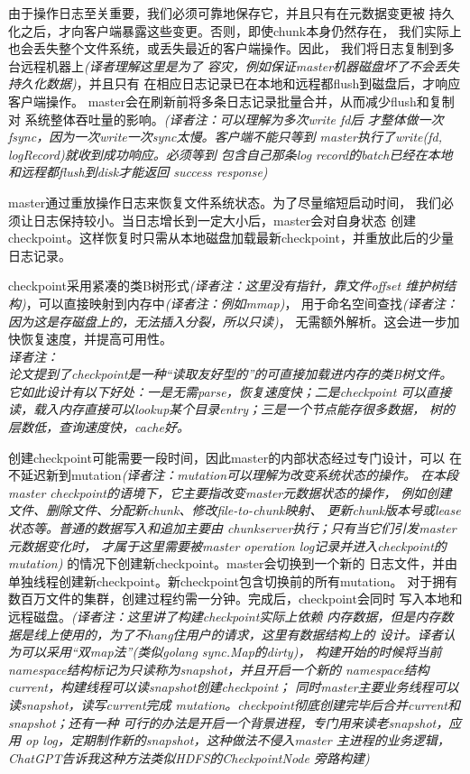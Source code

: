 由于操作日志至关重要，我们必须可靠地保存它，并且只有在元数据变更被
持久化之后，才向客户端暴露这些变更。否则，即使chunk本身仍然存在，
我们实际上也会丢失整个文件系统，或丢失最近的客户端操作。因此，
我们将日志复制到多台远程机器上\emph{(译者理解这里是为了
容灾，例如保证master机器磁盘坏了不会丢失持久化数据)}，并且只有
在相应日志记录已在本地和远程都flush到磁盘后，才响应客户端操作。
master会在刷新前将多条日志记录批量合并，从而减少flush和复制对
系统整体吞吐量的影响。\emph{(译者注：可以理解为多次write fd后
才整体做一次fsync，因为一次write一次sync太慢。客户端不能只等到
master执行了write(fd, logRecord)就收到成功响应。必须等到
包含自己那条log record的batch已经在本地和远程都flush到disk才能返回
success response)}

master通过重放操作日志来恢复文件系统状态。为了尽量缩短启动时间，
我们必须让日志保持较小。当日志增长到一定大小后，master会对自身状态
创建checkpoint。这样恢复时只需从本地磁盘加载最新checkpoint，并重放此后的少量
日志记录。

checkpoint采用紧凑的类B树形式\emph{(译者注：这里没有指针，靠文件offset
维护树结构)}，可以直接映射到内存中\emph{(译者注：例如mmap)}，
用于命名空间查找\emph{(译者注：因为这是存磁盘上的，无法插入分裂，所以只读)}，
无需额外解析。这会进一步加快恢复速度，并提高可用性。\\\emph{译者注：\\
论文提到了checkpoint是一种“读取友好型的”的可直接加载进内存的类B树文件。
它如此设计有以下好处：一是无需parse，恢复速度快；二是checkpoint
可以直接读，载入内存直接可以lookup某个目录entry；三是一个节点能存很多数据，
树的层数低，查询速度快，cache好。
}

创建checkpoint可能需要一段时间，因此master的内部状态经过专门设计，可以
在不延迟新到mutation\emph{(译者注：mutation可以理解为改变系统状态的操作。
在本段master checkpoint的语境下，它主要指改变master元数据状态的操作，
例如创建文件、删除文件、分配新chunk、修改file-to-chunk映射、
更新chunk版本号或lease状态等。普通的数据写入和追加主要由
chunkserver执行；只有当它们引发master元数据变化时，
才属于这里需要被master operation log记录并进入checkpoint的mutation)}
的情况下创建新checkpoint。master会切换到一个新的
日志文件，并由单独线程创建新checkpoint。新checkpoint包含切换前的所有mutation。
对于拥有数百万文件的集群，创建过程约需一分钟。完成后，checkpoint会同时
写入本地和远程磁盘。\emph{(译者注：这里讲了构建checkpoint实际上依赖
内存数据，但是内存数据是线上使用的，为了不hang住用户的请求，这里有数据结构上的
设计。译者认为可以采用“双map法”(类似golang sync.Map的dirty)，
构建开始的时候将当前namespace结构标记为只读称为snapshot，并且开启一个新的
namespace结构current，构建线程可以读snapshot创建checkpoint；
同时master主要业务线程可以读snapshot，读写current完成
mutation。checkpoint彻底创建完毕后合并current和snapshot；还有一种
可行的办法是开启一个背景进程，专门用来读老snapshot，应用
op log，定期制作新的snapshot，这种做法不侵入master
主进程的业务逻辑，ChatGPT告诉我这种方法类似HDFS的CheckpointNode
旁路构建)}


